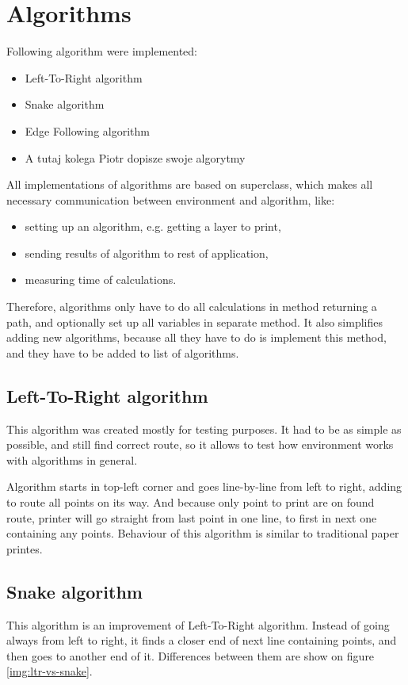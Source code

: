 \documentclass[titlepage]{article}
\begin{document}
\section{Algorithms}
Following algorithm were implemented:
\begin{itemize}
\item Left-To-Right algorithm
\item Snake algorithm
\item Edge Following algorithm
\item A tutaj kolega Piotr dopisze swoje algorytmy
\end{itemize}
All implementations of algorithms are based on superclass, which makes all necessary communication between environment and algorithm, like:
\begin{itemize}
\item setting up an algorithm, e.g. getting a layer to print,
\item sending results of algorithm to rest of application,
\item measuring time of calculations.
\end{itemize}
Therefore, algorithms only have to do all calculations in method returning a path, and optionally set up all variables in separate method. It also simplifies adding new algorithms, because all they have to do is implement this method, and they have to be added to list of algorithms.

\subsection{Left-To-Right algorithm}
This algorithm was created mostly for testing purposes. It had to be as simple as possible, and still find correct route, so it allows to test how environment works with algorithms in general.

Algorithm starts in top-left corner and goes line-by-line from left to right, adding to route all points on its way. And because only point to print are on found route, printer will go straight from last point in one line, to first in next one containing any points. Behaviour of this algorithm is similar to traditional paper printes.

\subsection{Snake algorithm}
This algorithm is an improvement of Left-To-Right algorithm. Instead of going always from left to right, it finds a closer end of next line containing points, and then goes to another end of it. Differences between them are show on figure \ref{img:ltr-vs-snake}.
\end{document}
